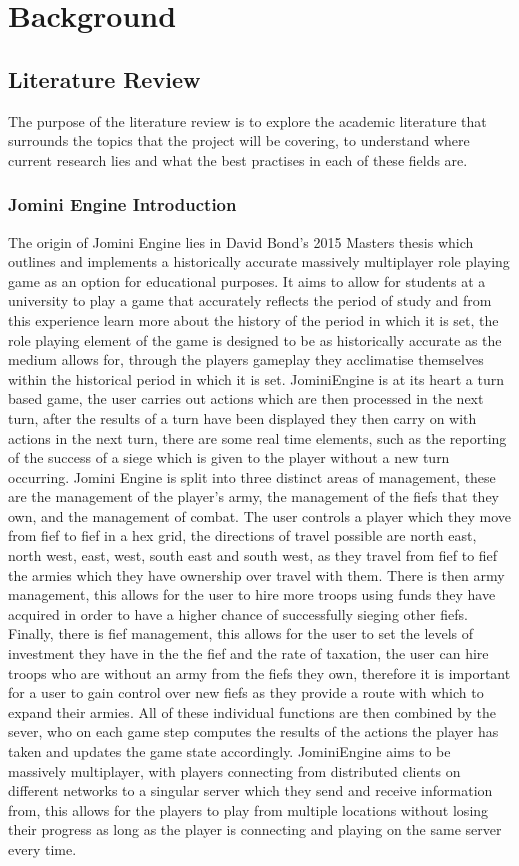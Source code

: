 \documentclass{article}
\begin{document}
	\section{Background}
	\subsection{Literature Review}
	The purpose of the literature review is to explore the academic literature that surrounds the topics that the project will be covering, to understand where current research lies and what the best practises in each of these fields are.
	\subsubsection{Jomini Engine Introduction}
	The origin of Jomini Engine lies in David Bond's 2015 Masters thesis\cite{DavidBond} which outlines and implements a historically accurate massively multiplayer role playing game as an option for educational purposes. It aims to allow for students at a university to play a game that accurately reflects the period of study and from this experience learn more about the history of the period in which it is set, the role playing element of the game is designed to be as historically accurate as the medium allows for,  through the players gameplay they acclimatise themselves within the historical period in which it is set. JominiEngine is at its heart a turn based game, the user carries out actions which are then processed in the next turn, after the results of a turn have been displayed they then carry on with actions in the next turn, there are some real time elements, such as the reporting of the success of a siege which is given to the player without a new turn occurring. Jomini Engine is split into three distinct areas of management, these are the management of the player's army, the management of the fiefs that they own, and the management of combat. The user controls a player which they move from fief to fief in a hex grid, the directions of travel possible are north east, north west, east, west, south east and south west, as they travel from fief to fief the armies which they have ownership over travel with them. There is then army management, this allows for the user to hire more troops using funds they have acquired in order to have a higher chance of successfully sieging other fiefs. Finally, there is fief management, this allows for the user to set the levels of investment they have in the the fief and the rate of taxation, the user can hire troops who are without an army from the fiefs they own, therefore it is important for a user to gain control over new fiefs as they provide a route with which to expand their armies. All of these individual functions are then combined by the sever, who on each game step computes the results of the actions the player has taken and updates the game state accordingly. JominiEngine aims to be massively multiplayer, with players connecting from distributed clients on different networks to a singular server which they send and receive information from, this allows for the players to play from multiple locations without losing their progress as long as the player is connecting and playing on the same server every time.
\end{document}
